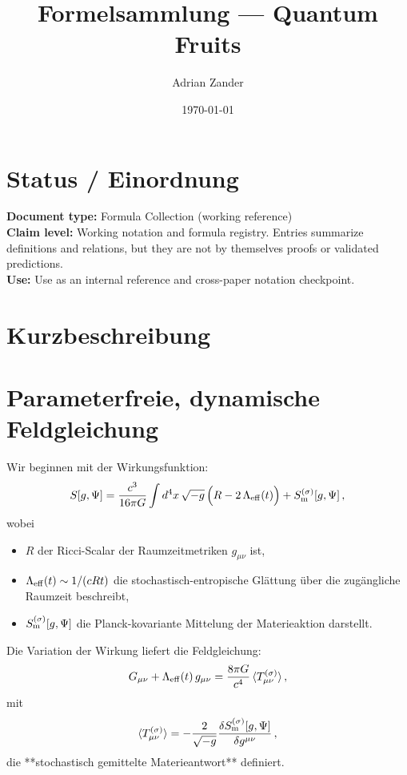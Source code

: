 \documentclass[11pt,a4paper]{article}
\title{Formelsammlung — Quantum Fruits}
\author{Adrian Zander}
\date{\today}
\begin{document}
\maketitle

\section*{Status / Einordnung}
\noindent\textbf{Document type:} Formula Collection (working reference)\\
\textbf{Claim level:} Working notation and formula registry. Entries summarize definitions and relations, but they are not by themselves proofs or validated predictions.\\
\textbf{Use:} Use as an internal reference and cross-paper notation checkpoint.

\section*{Kurzbeschreibung}

\section*{Parameterfreie, dynamische Feldgleichung}

Wir beginnen mit der Wirkungsfunktion:
\begin{equation}
S[g, \Psi] 
= \frac{c^3}{16\pi G} \int d^4x \, \sqrt{-g} \, \Big(R - 2\,\Lambda_{\rm eff}(t)\Big) 
+ S_{\rm m}^{(\sigma)}[g, \Psi] \,,
\end{equation}
wobei
\begin{itemize}
    \item $R$ der Ricci-Scalar der Raumzeitmetriken $g_{\mu\nu}$ ist,
    \item $\Lambda_{\rm eff}(t) \sim 1/(c R t)$ die stochastisch-entropische Glättung über die zugängliche Raumzeit beschreibt,
    \item $S_{\rm m}^{(\sigma)}[g,\Psi]$ die Planck-kovariante Mittelung der Materieaktion darstellt.
\end{itemize}

Die Variation der Wirkung liefert die Feldgleichung:
\begin{equation}
G_{\mu\nu} + \Lambda_{\rm eff}(t) \, g_{\mu\nu} = \frac{8 \pi G}{c^4} \, \langle T_{\mu\nu}^{(\sigma)} \rangle \,,
\end{equation}
mit
\begin{equation}
\langle T_{\mu\nu}^{(\sigma)} \rangle = -\frac{2}{\sqrt{-g}} \frac{\delta S_{\rm m}^{(\sigma)}[g,\Psi]}{\delta g^{\mu\nu}} \,,
\end{equation}
die **stochastisch gemittelte Materieantwort** definiert.  
\end{document}
